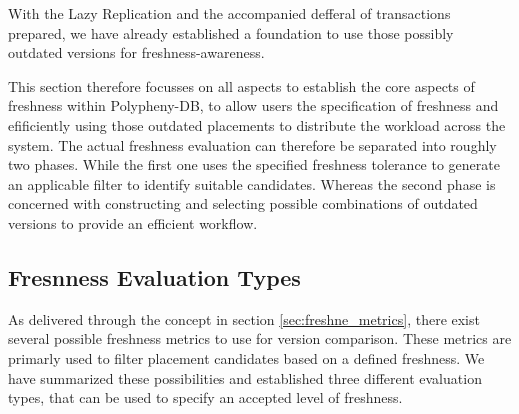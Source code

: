With the Lazy Replication and the accompanied defferal of transactions prepared, we have already established a foundation to use those possibly outdated versions
for freshness-awareness.

This section therefore focusses on all aspects to establish the core aspects of freshness within Polypheny-DB,
to allow users the specification of freshness and efificiently using those outdated placements to distribute the workload across the system.
The actual freshness evaluation can therefore be separated into roughly two phases. While the first one uses the specified freshness tolerance to generate an 
applicable filter to identify suitable candidates. Whereas the second phase is concerned with constructing and selecting possible combinations of outdated versions
to provide an efficient workflow.



\subsection{Fresnness Evaluation Types}
\label{sec:eval_types}

As delivered through the concept in section \ref{sec:freshne_metrics}, there exist several possible freshness metrics to use for version comparison.
These metrics are primarly used to filter placement candidates based on a defined freshness.
We have summarized these possibilities and established three different evaluation types, that can be used to specify an accepted level of freshness.

